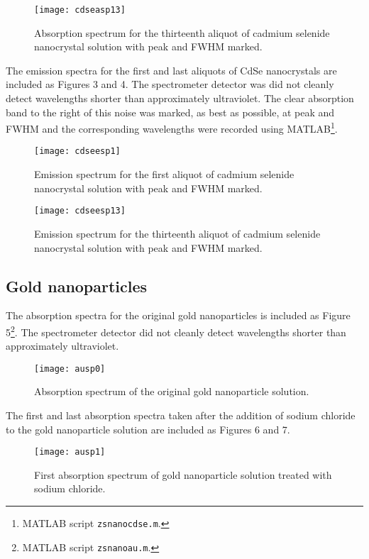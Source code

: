 \documentclass{article}
\begin{document}
\begin{figure}[H]
\texttt{[image: cdseasp13]}
\centering
\caption{Absorption spectrum for the thirteenth aliquot of cadmium selenide nanocrystal 
solution with peak and FWHM marked.}
\end{figure}

The emission spectra for the first and last aliquots of CdSe nanocrystals are included as
Figures 3 and 4. The spectrometer detector was did not cleanly detect wavelengths shorter 
than approximately ultraviolet. The clear absorption band to the right of this noise was 
marked, as best as possible, at peak and FWHM and the corresponding wavelengths were
recorded using MATLAB\footnote{MATLAB script \texttt{zs\textunderscore nanocdse.m}.}.

\begin{figure}[H]
\texttt{[image: cdseesp1]}
\centering
\caption{Emission spectrum for the first aliquot of cadmium selenide nanocrystal 
solution with peak and FWHM marked.}
\end{figure}

\begin{figure}[H]
\texttt{[image: cdseesp13]}
\centering
\caption{Emission spectrum for the thirteenth aliquot of cadmium selenide nanocrystal 
solution with peak and FWHM marked.}
\end{figure}

\subsection{Gold nanoparticles}

The absorption spectra for the original gold nanoparticles is included as
Figure 5\footnote{MATLAB script \texttt{zs\textunderscore nanoau.m}.}. The spectrometer 
detector did not cleanly detect wavelengths shorter than approximately ultraviolet.

\begin{figure}[H]
\texttt{[image: ausp0]}
\centering
\caption{Absorption spectrum of the original gold nanoparticle solution.}
\end{figure}

The first and last absorption spectra taken after the addition of sodium chloride to the
gold nanoparticle solution are included as Figures 6 and 7.

\begin{figure}[H]
\texttt{[image: ausp1]}
\centering
\caption{First absorption spectrum of gold nanoparticle solution treated with sodium 
chloride.}
\end{figure}
\end{document}
